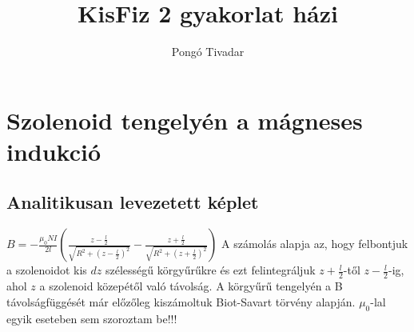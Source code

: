 \documentclass{article}
\title{KisFiz 2 gyakorlat házi}
\author{Pongó Tivadar}
\date{}
\begin{document}
\maketitle
\noindent
\section{Szolenoid tengelyén a mágneses indukció}
\subsection{Analitikusan levezetett képlet}
$\displaystyle B = -\frac{\mu_0 N I}{2l} \left( \frac{z - \frac{l}{2}}{\sqrt{R^2 + \left( z - \frac{l}{2} \right)^2 }} - \frac{z + \frac{l}{2}}{\sqrt{R^2 + \left( z + \frac{l}{2} \right)^2 }} \right) $
\newline \newline
A számolás alapja az, hogy felbontjuk a szolenoidot kis $dz$ szélességű körgyűrűkre és ezt felintegráljuk $ z + \frac{l}{2} $-től $z - \frac{l}{2}$-ig, ahol $z$ a szolenoid közepétől való távolság. A körgyűrű tengelyén a B távolságfüggését már előzőleg kiszámoltuk Biot-Savart törvény alapján.
\newline \newline
$\mu_0$-lal egyik eseteben sem szoroztam be!!!
\end{document}
